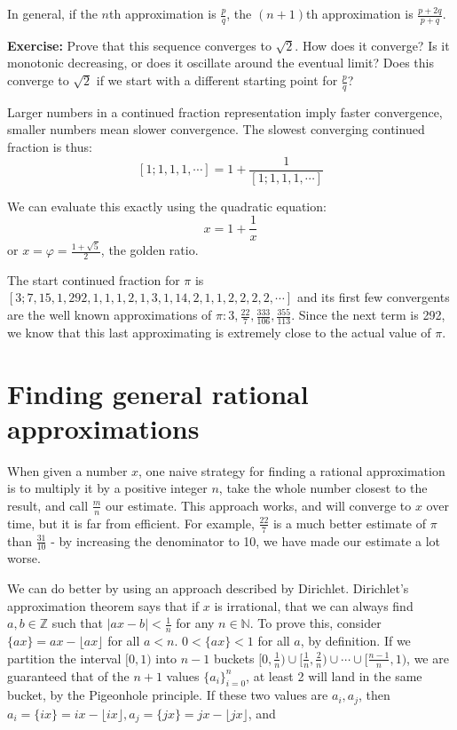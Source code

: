 \documentclass{article}
\begin{document}
In general, if the $n$th approximation is $\frac{p}{q}$, the $(n+1)$th approximation is 
$\frac{p+2q}{p+q}$.

\textbf{Exercise:} Prove that this sequence converges to $\sqrt{2}$. How does it converge?
Is it monotonic decreasing, or does it oscillate around the eventual limit? Does this
converge to $\sqrt{2}$ if we start with a different starting point for $\frac{p}{q}$?

Larger numbers in a continued fraction representation imply faster convergence, smaller
numbers mean slower convergence. The slowest converging continued fraction is thus:
\[\left[1;1,1,1,\cdots\right] = 1+\frac{1}{\left[1;1,1,1,\cdots\right]}\]

We can evaluate this exactly using the quadratic equation:
\[ x = 1+\frac{1}{x} \]
or $x = \varphi = \frac{1+\sqrt{5}}{2}$, the golden ratio.

The start continued fraction for $\pi$ is
$\left[3;7,15,1,292,1,1,1,2,1,3,1,14,2,1,1,2,2,2,2,\cdots\right]$ and its first few
convergents are the well known approximations of $\pi: 3, \frac{22}{7}, \frac{333}{106}, \frac{355}{113}$.
Since the next term is 292, we know that this last approximating is extremely close to the actual
value of $\pi$.

\section{Finding general rational approximations}

When given a number $x$, one naive strategy for finding a rational approximation is to multiply
it by a positive integer $n$, take the whole number closest to the result, and call $\frac{m}{n}$ our
estimate. This approach works, and will converge to $x$ over time, but it is far from efficient. For
example, $\frac{22}{7}$ is a much better estimate of $\pi$ than $\frac{31}{10}$ - by increasing the
denominator to 10, we have made our estimate a lot worse.

We can do better by using an approach described by Dirichlet. Dirichlet's approximation theorem
says that if $x$ is irrational, that we can always find $a,b \in \mathbb{Z}$ such that
$|ax-b|<\frac{1}{n}$ for any $n\in \mathbb{N}$. To prove this, consider $\{ax\} = ax - 
\lfloor ax \rfloor$ for all $a < n$. $0<\{ax\}<1$ for all $a$, by definition. If we partition the
interval $[0,1)$ into $n-1$ buckets $[0,\frac{1}{n}) \cup [\frac{1}{n},\frac{2}{n}) \cup \cdots
\cup [\frac{n-1}{n}, 1)$, we are guaranteed that of the $n+1$ values $\{a_i\}_{i=0}^n$, at
least 2 will land in the same bucket, by the Pigeonhole principle. If these two values are $a_i, a_j$,
then $a_i = \{ix\} = ix - \lfloor ix \rfloor, a_j = \{jx\} = jx - \lfloor jx \rfloor$, and
\end{document}
